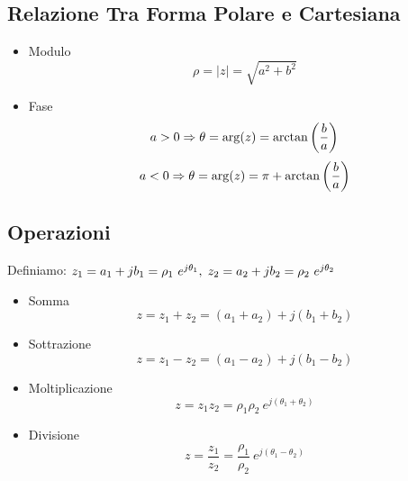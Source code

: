 \subsection{Relazione Tra Forma Polare e Cartesiana}
    \begin{itemize}
        \item {Modulo
            \[
                \rho = |z| = \sqrt{a^2+b^2}
            \]
        }
        \item {Fase
            \[
                 a \\> 0 \Rightarrow \theta = \arg(z) = \arctan\left(\frac{b}{a}\right)
            \]
            \[
                a \\< 0 \Rightarrow \theta = \arg(z) =\pi + \arctan\left(\frac{b}{a}\right) 
            \]

        }
    \end{itemize}


\subsection{Operazioni}
    Definiamo: $z_1 = a_1 + jb_1 = \rho_1 \ e^{j\theta_1},\hspace{0.1cm} z_2 = a_2 + jb_2 = \rho_2 \ e^{j\theta_2} $
    \begin{itemize}
        \item {Somma
            \[
                z = z_1 + z_2 = (a_1 + a_2) + j(b_1 + b_2)
            \]
        }
        \item {Sottrazione
            \[
                z = z_1 - z_2 = (a_1 - a_2) + j(b_1 - b_2)
            \]
        }
        \item {Moltiplicazione
            \[
                z = z_1 z_2 = \rho_1\rho_2 \ e^{j(\theta_1+\theta_2)}
            \]
        }
        \item {Divisione
            \[
                z = \frac{z_1}{z_2} = \frac{\rho_1}{\rho_2} \ e^{j(\theta_1-\theta_2)}
            \]
        }
    \end{itemize}
